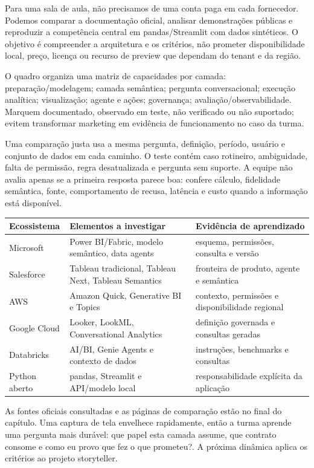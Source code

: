 Para uma sala de aula, não precisamos de uma conta paga em cada fornecedor. Podemos comparar a documentação oficial, analisar demonstrações públicas e reproduzir a competência central em pandas/Streamlit com dados sintéticos. O objetivo é compreender a arquitetura e os critérios, não prometer disponibilidade local, preço, licença ou recurso de preview que dependam do tenant e da região.

O quadro organiza uma matriz de capacidades por camada: preparação/modelagem; camada semântica; pergunta conversacional; execução analítica; visualização; agente e ações; governança; avaliação/observabilidade. Marquem documentado, observado em teste, não verificado ou não suportado; evitem transformar marketing em evidência de funcionamento no caso da turma.

Uma comparação justa usa a mesma pergunta, definição, período, usuário e conjunto de dados em cada caminho. O teste contém caso rotineiro, ambiguidade, falta de permissão, regra desatualizada e pergunta sem suporte. A equipe não avalia apenas se a primeira resposta parece boa: confere cálculo, fidelidade semântica, fonte, comportamento de recusa, latência e custo quando a informação está disponível.

\begin{center}
\small\begin{tabularx}{\textwidth}{p{2.8cm}p{5.0cm}X}
\toprule
Ecossistema & Elementos a investigar & Evidência de aprendizado \\
\midrule
Microsoft & Power BI/Fabric, modelo semântico, data agents & esquema, permissões, consulta e versão \\
Salesforce & Tableau tradicional, Tableau Next, Tableau Semantics & fronteira de produto, agente e semântica \\
AWS & Amazon Quick, Generative BI e Topics & contexto, permissões e disponibilidade regional \\
Google Cloud & Looker, LookML, Conversational Analytics & definição governada e consultas geradas \\
Databricks & AI/BI, Genie Agents e contexto de dados & instruções, benchmarks e consultas \\
Python aberto & pandas, Streamlit e API/modelo local & responsabilidade explícita da aplicação \\
\bottomrule
\end{tabularx}\normalsize
\end{center}

As fontes oficiais consultadas e as páginas de comparação estão no final do capítulo. Uma captura de tela envelhece rapidamente, então a turma aprende uma pergunta mais durável: que papel esta camada assume, que contrato consome e como eu provo que fez o que prometeu?. A próxima dinâmica aplica os critérios ao projeto storyteller.

